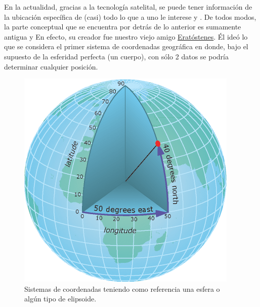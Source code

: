 \documentclass[
  letterpaper,
  DIV=11,
  numbers=noendperiod]{scrreprt}
\begin{document}
\begin{tcolorbox}[enhanced jigsaw, colback=white, title=\textcolor{quarto-callout-note-color}{\faInfo}\hspace{0.5em}{Los mapas en la historia}, breakable, colbacktitle=quarto-callout-note-color!10!white, opacityback=0, opacitybacktitle=0.6, titlerule=0mm, toprule=.15mm, toptitle=1mm, leftrule=.75mm, rightrule=.15mm, bottomrule=.15mm, arc=.35mm, coltitle=black, bottomtitle=1mm, left=2mm, colframe=quarto-callout-note-color-frame]

En la actualidad, gracias a la tecnología satelital, se puede tener
información de la ubicación específica de (casi) todo lo que a uno le
interese y . De todos modos, la parte conceptual que se encuentra por
detrás de lo anterior es sumamente antigua y En efecto, su creador fue
nuestro viejo amigo
\href{https://diegoteca.com.ar/metodocuanti/?p=188}{Eratóstenes}. Él
ideó lo que se considera el primer sistema de coordenadas geográfica en
donde, bajo el supuesto de la esferidad perfecta (un cuerpo), con sólo 2
datos se podría determinar cualquier posición.

\begin{figure}[H]

{\centering \includegraphics{./Inputs/Images/coordenadas.gif}

}

\caption{Sistemas de coordenadas teniendo como referencia una esfera o
algún tipo de elipsoide.}

\end{figure}


\end{tcolorbox}
\end{document}
